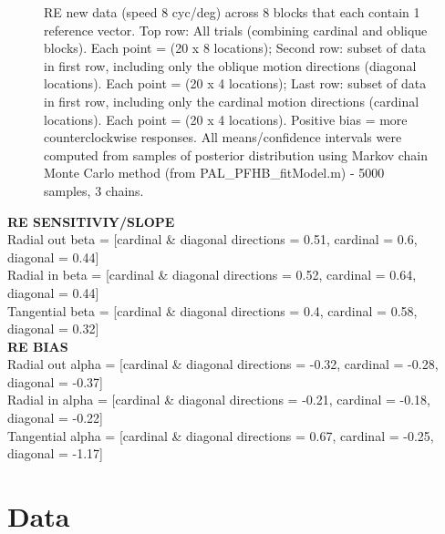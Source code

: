 \documentclass[11pt]{article} %
\begin{document}
\begin{figure}[H]
\caption{RE new data (speed 8 cyc/deg) across 8 blocks that each contain 1 reference vector. Top row: All trials (combining cardinal and oblique blocks). Each point = (20 x 8 locations); Second row: subset of data in first row, including only the oblique motion directions (diagonal locations). Each point = (20 x 4 locations); Last row: subset of data in first row, including only the cardinal motion directions (cardinal locations). Each point = (20 x 4 locations). Positive bias = more counterclockwise responses. All means/confidence intervals were computed from samples of posterior distribution using Markov chain Monte Carlo method (from PAL\_PFHB\_fitModel.m) - 5000 samples, 3 chains.}
\end{figure}

\textbf{RE SENSITIVIY/SLOPE}
\\
Radial out beta = [cardinal \& diagonal directions =  0.51, cardinal = 0.6, diagonal = 0.44]
\\
Radial in beta = [cardinal \& diagonal directions =  0.52, cardinal = 0.64, diagonal = 0.44]
\\
Tangential beta = [cardinal \& diagonal directions =  0.4, cardinal = 0.58, diagonal = 0.32]
\\
\textbf{RE BIAS}
\\
Radial out alpha = [cardinal \& diagonal directions =  -0.32, cardinal = -0.28, diagonal = -0.37]
\\
Radial in alpha = [cardinal \& diagonal directions =  -0.21, cardinal = -0.18, diagonal = -0.22]
\\
Tangential alpha = [cardinal \& diagonal directions =  0.67, cardinal = -0.25, diagonal = -1.17]

\newpage
\section{Data}
\end{document}
